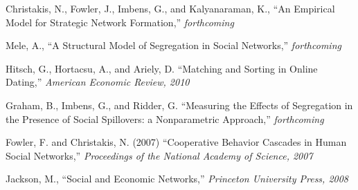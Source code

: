 \documentclass[11pt,reqno]{amsart}
\numberwithin{equation}{section}
\begin{document}
\begin{thebibliography}{9}

Christakis, N., Fowler, J., Imbens, G., and Kalyanaraman, K., 
``An Empirical Model for Strategic Network Formation,'' 
\emph{forthcoming} 

Mele, A., 
``A Structural Model of Segregation in Social Networks,'' 
\emph{forthcoming} 

Hitsch, G., Hortacsu, A., and Ariely, D. 
``Matching and Sorting in Online Dating,'' 
\emph{American Economic Review, 2010} 

Graham, B., Imbens, G., and Ridder, G. 
``Measuring the Effects of Segregation in the Presence of Social Spillovers: a Nonparametric Approach,'' 
\emph{forthcoming} 

Fowler, F. and Christakis, N. (2007) 
``Cooperative Behavior Cascades in Human Social Networks,'' 
\emph{Proceedings of the National Academy of Science, 2007} 

Jackson, M., 
``Social and Economic Networks,'' 
\emph{Princeton University Press, 2008} 



	
\end{thebibliography}
\end{document}
